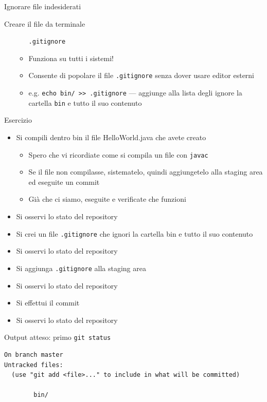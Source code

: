 \documentclass[xcolor=dvipsnames,presentation]{beamer}
\begin{document}
\begin{frame}{Ignorare file indesiderati}
\begin{block}{Creare il file da terminale}
\begin{itemize}
\begin{itemize}
\texttt{.gitignore}
                \item Funziona su tutti i sistemi!
                \item Consente di popolare il file \texttt{.gitignore} senza dover usare editor
esterni
                \item e.g. \texttt{echo bin/ >> .gitignore} --- aggiunge alla lista degli ignore la
cartella \texttt{bin} e tutto il suo contenuto
            \end{itemize}
        \end{itemize}
    \end{block}
    \begin{block}{Esercizio}
        \begin{itemize}
            \item Si compili dentro bin il file HelloWorld.java che avete creato
            \begin{itemize}
                \item Spero che vi ricordiate come si compila un file con \texttt{javac}
                \item Se il file non compilasse, sistematelo, quindi aggiungetelo alla staging area
ed eseguite un commit
                \item Già che ci siamo, eseguite e verificate che funzioni
            \end{itemize}
            \item Si osservi lo stato del repository
            \item Si crei un file \texttt{.gitignore} che ignori la cartella bin e tutto il suo
contenuto
            \item Si osservi lo stato del repository
            \item Si aggiunga \texttt{.gitignore} alla staging area
            \item Si osservi lo stato del repository
            \item Si effettui il commit
            \item Si osservi lo stato del repository
        \end{itemize}
    \end{block}
    \begin{block}{Output atteso: primo \texttt{git status}}
        \begin{Verbatim}[fontsize=\scriptsize]
On branch master
Untracked files:
  (use "git add <file>..." to include in what will be committed)

        bin/


\end{Verbatim}
\end{block}
\end{frame}
\end{document}
